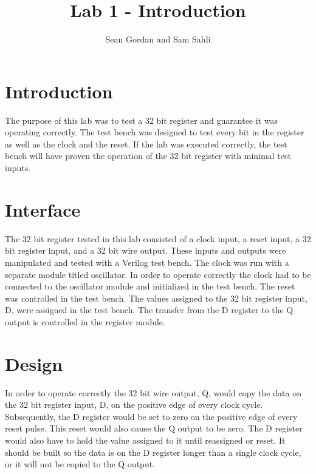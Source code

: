 \documentclass{article}
\author{Sean Gordan and Sam Sahli}
\title{Lab 1 - Introduction}
\begin{document}
\maketitle

\section{Introduction}
The purpose of this lab was to test a 32 bit register and guarantee it was operating correctly. The test bench was designed to test every bit in the register as well as the clock and the reset. If the lab was executed correctly, the test bench will have proven the operation of the 32 bit register with minimal test inputs.

\section{Interface}
The 32 bit register tested in this lab consisted of a clock input, a reset input, a 32 bit register input, and a 32 bit wire output. These inputs and outputs were manipulated and tested with a Verilog test bench. The clock was run with a separate module titled oscillator. In order to operate correctly the clock had to be connected to the oscillator module and initialized in the test bench. The reset was controlled in the test bench. The values assigned to the 32 bit register input, D, were assigned in the test bench. The transfer from the D register to the Q output is controlled in the register module. 

\section{Design}
In order to operate correctly the 32 bit wire output, Q, would copy the data on the 32 bit register input, D, on the positive edge of every clock cycle. Subsequently, the D register would be set to zero on the positive edge of every reset pulse. This reset would also cause the Q output to be zero. The D register would also have to hold the value assigned to it until reassigned or reset. It should be built so the data is on the D register longer than a single clock cycle, or it will not be copied to the Q output. 
\end{document}
